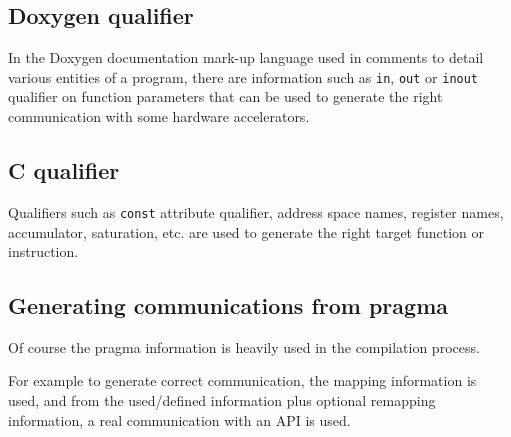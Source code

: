 \documentclass[a4paper]{article}
\begin{document}
\subsection{Doxygen qualifier}
\label{sec:doxygen-qualifier}

In the Doxygen documentation mark-up language used in comments to detail
various entities of a program, there are information such as \texttt{in},
\texttt{out} or \texttt{inout} qualifier on function parameters that can
be used to generate the right communication with some hardware
accelerators.


\subsection{C qualifier}
\label{sec:c-qualifier}

Qualifiers such as \texttt{const} attribute qualifier, address space
names, register names, accumulator, saturation, etc. are used to generate
the right target function or instruction.


\subsection{Generating communications from pragma}
\label{sec:pragma}

Of course the pragma information is heavily used in the compilation
process.

For example to generate correct communication, the mapping information is
used, and from the used/defined information plus optional remapping
information, a real communication with an API is used.
\end{document}
